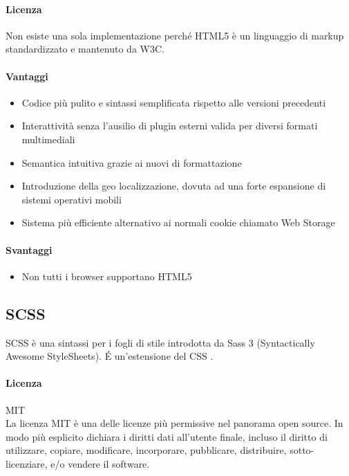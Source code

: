 \paragraph{Licenza}  
Non esiste una sola implementazione perché HTML5 è un linguaggio di markup standardizzato e mantenuto da W3C.



\paragraph{Vantaggi}
\begin{itemize}
	\item Codice più pulito e sintassi semplificata rispetto alle versioni precedenti
	\item Interattività senza l’ausilio di plugin esterni valida per diversi formati multimediali
	\item Semantica intuitiva grazie ai nuovi  di formattazione
	\item Introduzione della geo localizzazione, dovuta ad una forte espansione di sistemi operativi mobili
	\item Sistema più efficiente alternativo ai normali cookie chiamato Web Storage 

\end{itemize}

\paragraph{Svantaggi} 
\begin{itemize}
	\item Non tutti i browser supportano HTML5
\end{itemize}

\subsection{SCSS}

SCSS è una sintassi per i fogli di stile introdotta da Sass 3 (Syntactically Awesome StyleSheets). \'E un'estensione del CSS .

\paragraph{Licenza} MIT \\
La licenza MIT è una delle licenze più permissive nel panorama open
source. In modo più esplicito dichiara i diritti dati all'utente
finale, incluso il diritto di utilizzare, copiare, modificare,
incorporare, pubblicare, distribuire, sotto-licenziare, e/o vendere il
software. 

